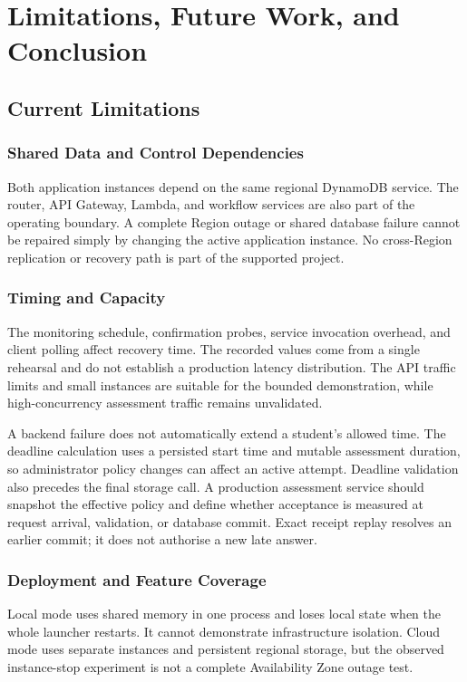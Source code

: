 \chapter{Limitations, Future Work, and Conclusion}
\section{Current Limitations}
\subsection{Shared Data and Control Dependencies}
Both application instances depend on the same regional DynamoDB service. The router, API Gateway, Lambda, and workflow services are also part of the operating boundary. A complete Region outage or shared database failure cannot be repaired simply by changing the active application instance. No cross-Region replication or recovery path is part of the supported project.
\subsection{Timing and Capacity}
The monitoring schedule, confirmation probes, service invocation overhead, and client polling affect recovery time. The recorded values come from a single rehearsal and do not establish a production latency distribution. The API traffic limits and small instances are suitable for the bounded demonstration, while high-concurrency assessment traffic remains unvalidated.

A backend failure does not automatically extend a student's allowed time. The deadline calculation uses a persisted start time and mutable assessment duration, so administrator policy changes can affect an active attempt. Deadline validation also precedes the final storage call. A production assessment service should snapshot the effective policy and define whether acceptance is measured at request arrival, validation, or database commit. Exact receipt replay resolves an earlier commit; it does not authorise a new late answer.
\subsection{Deployment and Feature Coverage}
Local mode uses shared memory in one process and loses local state when the whole launcher restarts. It cannot demonstrate infrastructure isolation. Cloud mode uses separate instances and persistent regional storage, but the observed instance-stop experiment is not a complete Availability Zone outage test.

